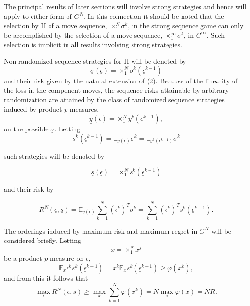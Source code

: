 \documentclass[11pt]{article}
\numberwithin{equation}{section}
\theoremstyle{boldStyle}
\begin{document}
The principal results of later sections will involve strong strategies and hence will apply to either form of \( G^N \). 
In this connection it should be noted that the selection by II of a move sequence, 
\( \times_1^N \sigma^k \), in the strong sequence game can only be accomplished 
by the selection of a move sequence, \( \times_1^\infty \sigma^k \), in \( G^\infty \). 
Such selection is implicit in all results involving strong strategies.

\bigbreak


Non-randomized sequence strategies for II will be denoted by
\[
\underline{\sigma}(\underline{\epsilon}) = \times_{1}^{N} \sigma^{k}(\underline{\epsilon}^{k-1})
\]
and their risk given by the natural extension of (2). Because of the linearity of the loss in the component moves, 
the sequence risks attainable by arbitrary randomization are attained by the class of randomized sequence strategies induced by product \( p \)-measures,
\[
\underline{y}(\epsilon) = \times_{1}^{N} y^{k}(\epsilon^{k-1}),
\]
on the possible \( \underline{\sigma} \). Letting
\begin{equation}
    s^{k}(\underline{\epsilon}^{k-1}) = \mathbb{E}_{\underline{y}(\underline{\epsilon})} \sigma^{k} = 
    \mathbb{E}_{y^k(\underline{\epsilon}^{k-1})} \sigma^{k}
\end{equation}

such strategies will be denoted by

\begin{equation*}
    \underline{s}(\underline{\epsilon}) = \times_{1}^{N} s^{k}(\underline{\epsilon}^{k-1})
\end{equation*}

and their risk by

\begin{equation}
    R^{N}(\underline{\epsilon}, \underline{s}) = \mathbb{E}_{\underline{y}(\underline{\epsilon})}
     \sum_{k=1}^{N} (\epsilon^{k})^T \sigma^{k} = \sum_{k=1}^{N} (\epsilon^{k})^T s^{k}(\underline{\epsilon}^{k-1}).
\end{equation}

\bigbreak

The orderings induced by maximum risk and maximum regret in \( G^{N} \) will be considered briefly. Letting
\[
\underline{x} = \times_{1}^{N} x^{j}
\]
be a product \( p \)-measure on \( \underline{\epsilon} \),
\[
\mathbb{E}_{\underline{x}} \epsilon^{k} s^{k}(\underline{\epsilon}^{k-1}) = x^{k} \mathbb{E}_{\underline{x}} s^{k}(\underline{\epsilon}^{k-1}) \geq \varphi(x^{k}),
\]
and from this it follows that
\[
\max_{\underline{\epsilon}} R^{N}(\underline{\epsilon}, \underline{s}) \geq \max_{\underline{x}} \sum_{k=1}^{N} \varphi(x^{k}) = N \max_{\underline{x}} \varphi(x) = NR.
\]
\end{document}
